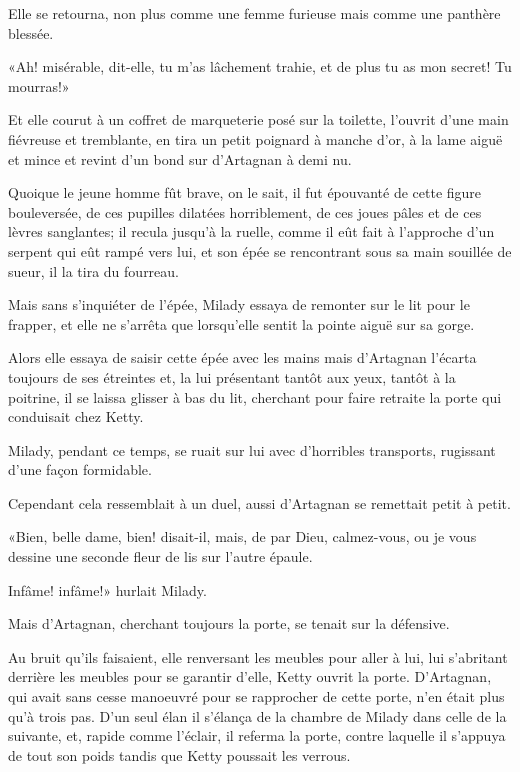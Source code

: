 Elle se retourna, non plus comme une femme furieuse mais comme une panthère blessée. 

«Ah! misérable, dit-elle, tu m'as lâchement trahie, et de plus tu as mon secret! Tu mourras!» 

Et elle courut à un coffret de marqueterie posé sur la toilette, l'ouvrit d'une main fiévreuse et tremblante, en tira un petit poignard à manche d'or, à la lame aiguë et mince et revint d'un bond sur d'Artagnan à demi nu. 

Quoique le jeune homme fût brave, on le sait, il fut épouvanté de cette figure bouleversée, de ces pupilles dilatées horriblement, de ces joues pâles et de ces lèvres sanglantes; il recula jusqu'à la ruelle, comme il eût fait à l'approche d'un serpent qui eût rampé vers lui, et son épée se rencontrant sous sa main souillée de sueur, il la tira du fourreau. 

Mais sans s'inquiéter de l'épée, Milady essaya de remonter sur le lit pour le frapper, et elle ne s'arrêta que lorsqu'elle sentit la pointe aiguë sur sa gorge. 

Alors elle essaya de saisir cette épée avec les mains mais d'Artagnan l'écarta toujours de ses étreintes et, la lui présentant tantôt aux yeux, tantôt à la poitrine, il se laissa glisser à bas du lit, cherchant pour faire retraite la porte qui conduisait chez Ketty. 

Milady, pendant ce temps, se ruait sur lui avec d'horribles transports, rugissant d'une façon formidable. 

Cependant cela ressemblait à un duel, aussi d'Artagnan se remettait petit à petit. 

«Bien, belle dame, bien! disait-il, mais, de par Dieu, calmez-vous, ou je vous dessine une seconde fleur de lis sur l'autre épaule. 

\speak  Infâme! infâme!» hurlait Milady. 

Mais d'Artagnan, cherchant toujours la porte, se tenait sur la défensive. 

Au bruit qu'ils faisaient, elle renversant les meubles pour aller à lui, lui s'abritant derrière les meubles pour se garantir d'elle, Ketty ouvrit la porte. D'Artagnan, qui avait sans cesse manoeuvré pour se rapprocher de cette porte, n'en était plus qu'à trois pas. D'un seul élan il s'élança de la chambre de Milady dans celle de la suivante, et, rapide comme l'éclair, il referma la porte, contre laquelle il s'appuya de tout son poids tandis que Ketty poussait les verrous. 

